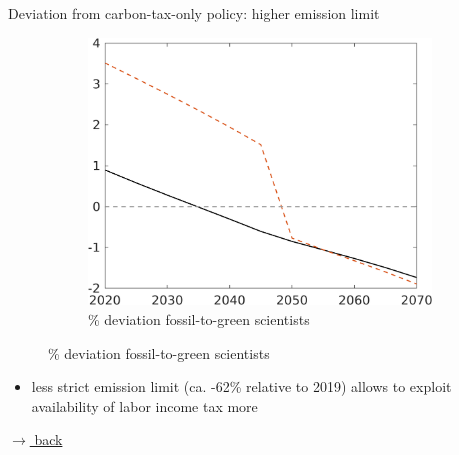 \documentclass[11pt,aspectratio=169]{beamer}
\begin{document}
\begin{frame}{Deviation from carbon-tax-only policy: higher emission limit}
\begin{figure}
\begin{subfigure}{0.4\textwidth}
		\caption{{\% deviation fossil-to-green scientists }}
		\includegraphics[width=1\textwidth]{../codding_model/own_basedOnFried/optimalPol_010922_revision/figures/all_13Sept22/EmsDecomp_CTO_Sens_sffsg_spillover0_knspil0_xgr0_nsk0_sep0_extern0_PV1_etaa0.79_lgd0.png}
	\end{subfigure}
\end{figure}
\vspace{3mm}
\begin{block}{}
	\begin{itemize}
		\item less strict emission limit (ca. -62\% relative to 2019) allows to exploit availability of labor income tax more
	\end{itemize}
\end{block}	

\vspace{-3mm}
\hfill	\hyperlink{mec}{\tiny{$\rightarrow$ back}}
\end{frame}
\end{document}
